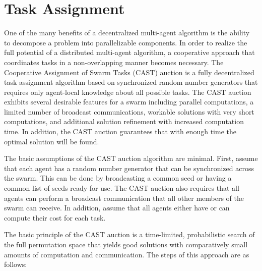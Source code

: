 \section{Task Assignment}

One of the many benefits of a decentralized multi-agent algorithm is the ability to decompose a problem into parallelizable components.  In order to realize the full potential of a distributed multi-agent algorithm, a cooperative approach that coordinates tasks in a non-overlapping manner becomes necessary.  The Cooperative Assignment of Swarm Tasks (CAST) auction \cite{palmer:CAST} is a fully decentralized task assignment algorithm based on synchronized random number generators that requires only agent-local knowledge about all possible tasks.  The CAST auction exhibits several desirable features for a swarm including parallel computations, a limited number of broadcast communications, workable solutions with very short computations, and  additional solution refinement with increased computation time.  In addition, the CAST auction guarantees that with enough time the optimal solution will be found.

The basic assumptions of the CAST auction algorithm are minimal.  First, assume that each agent has a random number generator that can be synchronized across the swarm.  This can be done by broadcasting a common seed or having a common list of seeds ready for use.  The CAST auction also requires that all agents can perform a broadcast communication that all other members of the swarm can receive.  In addition, assume that all agents either have or can compute their cost for each task.

The basic principle of the CAST auction is a time-limited, probabilistic search of the full permutation space that yields good solutions with comparatively small amounts of computation and communication.  The steps of this approach are as follows:

